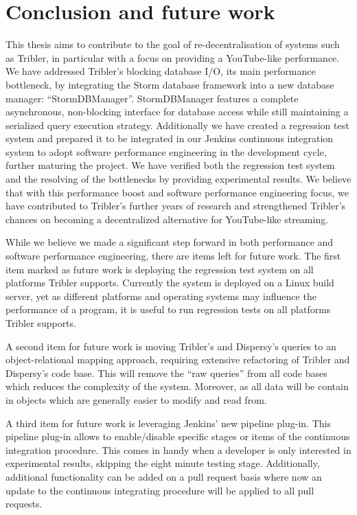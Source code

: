 \chapter{Conclusion and future work}
\label{cpt:conclusion_and_future_work}

This thesis aims to contribute to the goal of re-decentralisation of systems such as Tribler, in particular with a focus on providing a YouTube-like performance.
We have addressed Tribler's blocking database I/O, its main performance bottleneck, by integrating the Storm database framework into a new database manager: \enquote{StormDBManager}.
StormDBManager features a complete asynchronous, non-blocking interface for database access while still maintaining a serialized query execution strategy.
Additionally we have created a regression test system and prepared it to be integrated in our Jenkins continuous integration system to adopt software performance engineering in the development cycle, further maturing the project.
We have verified both the regression test system and the resolving of the bottlenecks by providing experimental results.
We believe that with this performance boost and software performance engineering focus, we have contributed to Tribler's further years of research and strengthened Tribler's chances on becoming a decentralized alternative for YouTube-like streaming.

While we believe we made a significant step forward in both performance and software performance engineering, there are items left for future work.
The first item marked as future work is deploying the regression test system on all platforms Tribler supports.
Currently the system is deployed on a Linux build server, yet as different platforms and operating systems may influence the performance of a program, it is useful to run regression tests on all platforms Tribler supports.

A second item for future work is moving Tribler's and Dispersy's queries to an object-relational mapping approach, requiring extensive refactoring of Tribler and Dispersy's code base.
This will remove the \enquote{raw queries} from all code bases which reduces the complexity of the system.
Moreover, as all data will be contain in objects which are generally easier to modify and read from.

A third item for future work is leveraging Jenkins' new pipeline plug-in.
This pipeline plug-in allows to enable/disable specific stages or items of the continuous integration procedure.
This comes in handy when a developer is only interested in experimental results, skipping the eight minute testing stage.
Additionally, additional functionality can be added on a pull request basis where now an update to the continuous integrating procedure will be applied to all pull requests.

